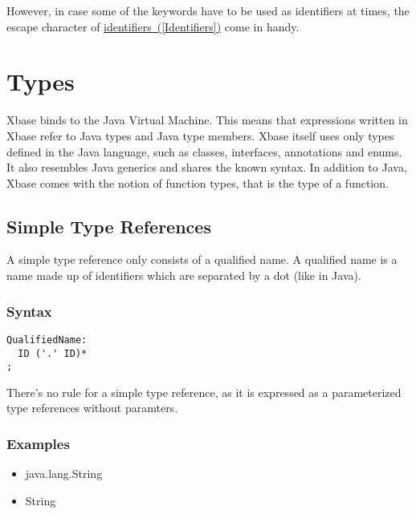 \documentclass[a4paper,10pt]{scrreprt}
\newlength{\itemindentlen}
\begin{document}
\addtolength{\itemindentlen}{2em}


However, in case some of the keywords have to be used as identifiers at times, the escape character of 
\hyperref[Identifiers]{identifiers~(\ref*{Identifiers})} come in handy. 





\chapter{Types\label{Types}}
Xbase binds to the Java Virtual Machine. This means that expressions written in Xbase refer to Java types and Java type members. Xbase itself uses only types 
defined in the Java language, such as classes, interfaces, annotations and enums. It also resembles Java generics and shares the known syntax. In addition to Java, Xbase comes with the
notion of function types, that is the type of a function. 

\section{Simple Type References\label{TypeReferences}}
A simple type reference only consists of a qualified name. A qualified name is a name made up of identifiers which are separated by a dot (like in Java).

\subsection{Syntax}
\begin{lstlisting}
QualifiedName:
  ID ('.' ID)*
;	

\end{lstlisting}


There's no rule for a simple type reference, as it is expressed as a parameterized type references without paramters.




\subsection{Examples}

\setlength{\itemindentlen}{\textwidth}
\begin{itemize}
\addtolength{\itemindentlen}{-2em}

\item \begin{minipage}[t]{\itemindentlen}
java.lang.String
\end{minipage}

\item \begin{minipage}[t]{\itemindentlen}
String
\end{minipage}

\end{itemize}
\addtolength{\itemindentlen}{2em}
\end{document}

